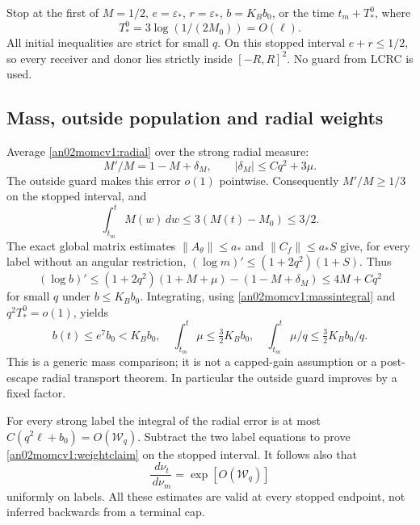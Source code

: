 \documentclass[11pt]{article}
\theoremstyle{remark}\newtheorem{remark}[theorem]{Remark}
\newcommand{\dd}{\,d}
\newcommand{\eps}{\varepsilon}
\begin{document}
Stop at the first of $M=1/2$, $e=\eps_*$, $r=\eps_*$,
$b=K_Bb_0$, or the time
$t_m+T_*^0$, where
\[
 T_*^0=3\log(1/(2M_0))=O(\ell).
\]
All initial inequalities are strict for small $q$.
On this stopped interval $e+r\le1/2$, so every receiver and donor
lies strictly inside $[-R,R]^2$. No guard from LCRC is used.

\subsection{Mass, outside population and radial weights}
Average \eqref{an02momcv1:radial} over the strong radial measure:
\[
 M'/M=1-M+\delta_M,\qquad
 |\delta_M|\le Cq^2+3\mu .
\]
The outside guard makes this error $o(1)$ pointwise.
Consequently $M'/M\ge1/3$ on the stopped interval, and
\begin{equation}\label{an02momcv1:massintegral}
 \int_{t_m}^{t}M(w)\dd w\le3(M(t)-M_0)\le3/2.
\end{equation}
The exact global matrix estimates
$\|A_\theta\|\le a_*$ and $\|C_f\|\le a_*S$ give, for every
label without an angular restriction,
$(\log m)'\le(1+2q^2)(1+S)$.
Thus
\[
 (\log b)'\le (1+2q^2)(1+M+\mu)-(1-M+\delta_M)
 \le4M+Cq^2
\]
for small $q$ under $b\le K_Bb_0$.
Integrating, using \eqref{an02momcv1:massintegral} and
$q^2T_*^0=o(1)$, yields
\begin{equation}\label{an02momcv1:bimprove}
 b(t)\le e^7b_0<K_Bb_0,\quad
 \int_{t_m}^{t}\mu\le\tfrac32 K_Bb_0,\quad
 \int_{t_m}^{t}\mu/q\le\tfrac32 K_Bb_0/q .
\end{equation}
This is a generic mass comparison; it is not a capped-gain
assumption or a post-escape radial transport theorem.
In particular the outside guard improves by a fixed factor.

For every strong label the integral of the radial error is at most
$C(q^2\ell+b_0)=O(\mathcal W_q)$.
Subtract the two label equations to prove
\eqref{an02momcv1:weightclaim} on the stopped interval.
It follows also that
\begin{equation}\label{an02momcv1:normalizedweights}
 \frac{\dd\nu_t}{\dd\nu_m}=\exp[O(\mathcal W_q)]
\end{equation}
uniformly on labels. All these estimates are valid at every
stopped endpoint, not inferred backwards from a terminal cap.
\end{document}
